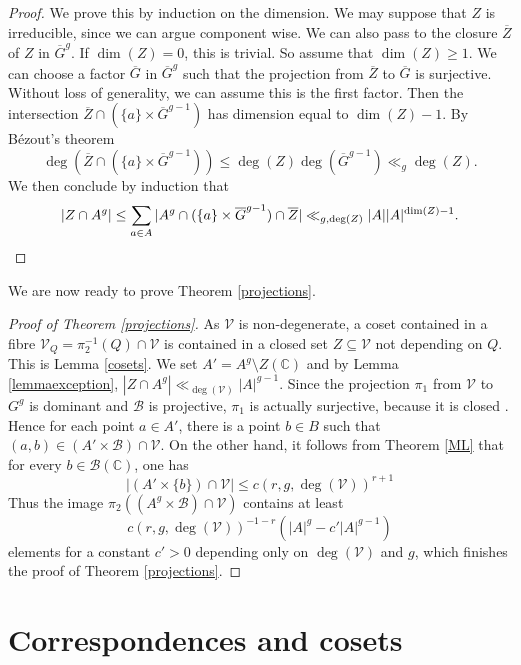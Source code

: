 \documentclass[12pt, reqno]{amsart}
\newcommand{\C}{\mathbb{C}}
\theoremstyle{remark}
\theoremstyle{definition}
\numberwithin{equation}{section}
\begin{document}
\begin{proof}
We prove this by induction on the dimension. We may suppose that $Z$ is irreducible, since we can argue component wise. We can also pass to the closure $\overline{Z}$ of $Z$ in $\overline{G}^g$. If $\dim(Z) = 0$, this is trivial. So assume that $\dim(Z) \geq 1$. We can choose a factor $\overline{G}$ in $\overline{G}^g$ such that the projection from $\overline{Z}$ to $\overline{G}$ is surjective. Without loss of generality, we can assume this is the first factor. Then the intersection $\overline{Z} \cap (\{a\}\times \overline{G}^{g-1})$ has dimension equal to $\dim(Z) -1$. By B{\' e}zout's theorem 
\[ \deg(\overline{Z} \cap (\{a\}\times \overline{G}^{g-1}) )
\leq \deg(Z) \deg(\overline{G}^{g - 1})
\ll_{g}\deg(Z).\]
We then conclude by induction that
$$|Z\cap A^g|\leq \sum_{a \in A}|A^g \cap (\{a\}\times \overline{G}^{g-1})\cap \overline{Z}|\ll_{g, \deg(Z)}|A||A|^{\dim(Z) -1}. \qedhere$$
\end{proof}

We are now ready to prove Theorem \ref{projections}.

\begin{proof}[Proof of Theorem \ref{projections}] As $\mathcal{V}$ is non-degenerate, a coset contained in a fibre $\mathcal{V}_Q = \pi_2^{-1}(Q)\cap \mathcal{V}$ is contained in a closed set $Z \subseteq \mathcal{V}$ not depending on $Q$. This is Lemma \ref{cosets}. We set $A' = A^g \setminus Z(\C)$ and by Lemma \ref{lemmaexception}, $|Z \cap A^g| \ll_{\deg(\mathcal{V})}|A|^{g-1} $. Since the projection $\pi_1$ from $\mathcal{V}$ to $G^g$ is dominant and $\mathcal{B}$ is projective, $\pi_1$ is actually surjective, because it is closed \cite{Shafarevic}. Hence for each point $a \in A'$, there is a point $b \in B$ such that $(a,b) \in (A'\times \mathcal{B})\cap \mathcal{V}$. On the other hand, it follows from Theorem \ref{ML} that for every $b \in \mathcal{B}(\C)$, one has
$$|(A'\times\{b\})\cap \mathcal{V}| \leq c(r,g, \deg(\mathcal{V}))^{r + 1}$$
Thus the image $\pi_2((A^g\times \mathcal{B}) \cap \mathcal{V})$ contains at least 
$$c(r, g, \deg(\mathcal{V}))^{-1-r}(|A|^g - c'|A|^{g-1})$$
elements for a constant $c' > 0$ depending only on $\deg(\mathcal{V})$ and $g$, which finishes the proof of Theorem \ref{projections}.
\end{proof}






\section{Correspondences and cosets}\label{sectioncorr}
\end{document}
